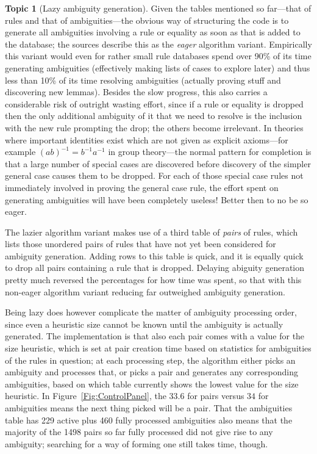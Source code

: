 \documentclass{article}
\theoremstyle{definition}
\newtheorem{topic}{Topic}
\begin{document}
\begin{topic}[Lazy ambiguity generation] \label{Topic:Lazier}
  Given the tables mentioned so far---that of rules and that of 
  ambiguities---the obvious way of structuring the code is to 
  generate all ambiguities involving a rule or equality as soon as 
  that is added to the database; the sources describe this as the 
  \emph{eager} algorithm variant. Empirically this variant would 
  even for rather small rule databases spend over 90\% of its time 
  generating ambiguities (effectively making lists of cases to 
  explore later) and thus less than 10\% of its time resolving 
  ambiguities (actually proving stuff and discovering new lemmas). 
  Besides the slow progress, this also carries a considerable risk of 
  outright wasting effort, since if a rule or equality is dropped 
  then the only 
  additional ambiguity of it that we need to resolve is the inclusion 
  with the new rule prompting the drop; the others become irrelevant. 
  In theories where important identities exist which are not given as 
  explicit axioms---for example \((ab)^{-1} = b^{-1} a^{-1}\) in 
  group theory---the normal pattern for completion is that a large 
  number of special cases are discovered before discovery of the 
  simpler general case causes them to be dropped. For each of those 
  special case rules not immediately involved in proving the general 
  case rule, the effort spent on generating ambiguities will have 
  been completely useless! Better then to no be so eager.
  
  The \textsf{lazier} algorithm variant makes use of a third table of 
  \emph{pairs} of rules, which lists those unordered pairs of rules 
  that have not yet been considered for ambiguity generation. Adding 
  rows to this table is quick, and it is equally quick to drop all 
  pairs containing a rule that is dropped. Delaying abiguity 
  generation pretty much reversed the percentages for how time was 
  spent, so that with this non-eager algorithm variant reducing far 
  outweighed ambiguity generation.
  
  Being lazy does however complicate the matter of ambiguity 
  processing order, since even a heuristic size cannot be known until 
  the ambiguity is actually generated. The implementation is that 
  also each pair comes with a value for the size heuristic, which is 
  set at pair creation time based on statistics for ambiguities of 
  the rules in question; at each processing step, the algorithm 
  either picks an ambiguity and processes that, or picks a pair and 
  generates any corresponding ambiguities, based on which table 
  currently shows the lowest value for the size heuristic. In 
  Figure~\ref{Fig:ControlPanel}, the $33.6$ for pairs versus $34$ for 
  ambiguities means the next thing picked will be a pair. That the 
  ambiguities table has 229 active plus 460 fully processed 
  ambiguities also means that the majority of the 1498 pairs so far 
  fully processed did not give rise to any ambiguity; searching for a 
  way of forming one still takes time, though.
\end{topic}
\end{document}
